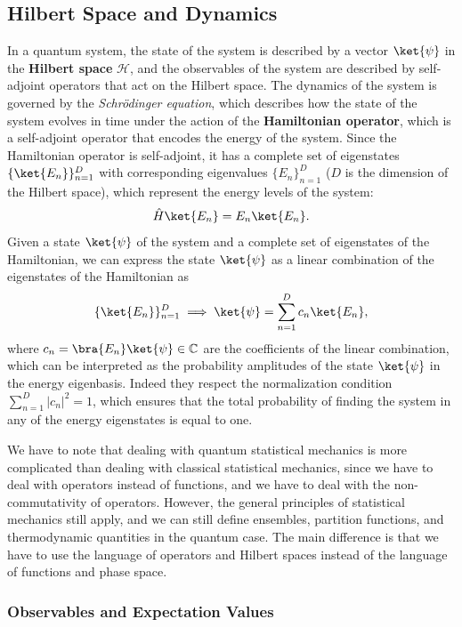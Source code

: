 \subsection{Hilbert Space and Dynamics}

In a quantum system, the state of the system is described by a vector \(\ket{\psi}\) in the \textbf{Hilbert space} \(\mathcal{H}\), and the observables of the system are described by self-adjoint operators that act on the Hilbert space. The dynamics of the system is governed by the \textit{Schrödinger equation}, which describes how the state of the system evolves in time under the action of the \textbf{Hamiltonian operator}, which is a self-adjoint operator that encodes the energy of the system. Since the Hamiltonian operator is self-adjoint, it has a complete set of eigenstates \(\{\ket{E_n}\}_{n=1}^D\) with corresponding eigenvalues \(\{E_n\}_{n=1}^D\) (\(D\) is the dimension of the Hilbert space), which represent the energy levels of the system:
\[
    \hat{H} \ket{E_n} = E_n \ket{E_n}.
\]
Given a state \(\ket{\psi}\) of the system and a complete set of eigenstates of the Hamiltonian, we can express the state \(\ket{\psi}\) as a linear combination of the eigenstates of the Hamiltonian as
\[
    \{\ket{E_n}\}_{n=1}^D \implies \ket{\psi} = \sum_{n=1}^D c_n \ket{E_n},
\]
where \(c_n = \bra{E_n} \ket{\psi} \in \mathbb{C}\) are the coefficients of the linear combination, which can be interpreted as the probability amplitudes of the state \(\ket{\psi}\) in the energy eigenbasis. Indeed they respect the normalization condition \(\sum_{n=1}^D |c_n|^2 = 1\), which ensures that the total probability of finding the system in any of the energy eigenstates is equal to one.

We have to note that dealing with quantum statistical mechanics is more complicated than dealing with classical statistical mechanics, since we have to deal with operators instead of functions, and we have to deal with the non-commutativity of operators. However, the general principles of statistical mechanics still apply, and we can still define ensembles, partition functions, and thermodynamic quantities in the quantum case. The main difference is that we have to use the language of operators and Hilbert spaces instead of the language of functions and phase space.

\subsubsection{Observables and Expectation Values}

